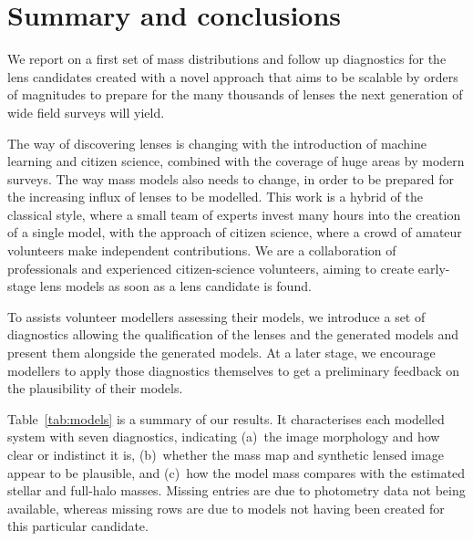 \section{Summary and conclusions}\label{sec:summary}


We report on a first set of mass distributions and follow up diagnostics for 
the {\SW} lens candidates created with a novel approach that aims to be scalable 
by orders of magnitudes to prepare for the many thousands of lenses the next 
generation of wide field surveys will yield.

The way of discovering lenses is changing with the introduction of
machine learning and citizen science, combined with the coverage of
huge areas by modern surveys.  The way mass models also needs to
change, in order to be prepared for the increasing influx of lenses to
be modelled.  This work is a hybrid of the classical style, where a
small team of experts invest many hours into the creation of a single
model, with the approach of citizen science, where a crowd of amateur
volunteers make independent contributions.  We are a collaboration of
professionals and experienced citizen-science volunteers, aiming to
create early-stage lens models as soon as a lens candidate is found.

To assists volunteer modellers assessing their models, we introduce a
set of diagnostics allowing the qualification of the lenses and the
generated models and present them alongside the generated models. At a
later stage, we encourage modellers to apply those diagnostics
themselves to get a preliminary feedback on the plausibility of their
models.

Table~\ref{tab:models} is a summary of our results.  It characterises
each modelled system with seven diagnostics, indicating (a)~the image
morphology and how clear or indistinct it is, (b)~whether the mass map
and synthetic lensed image appear to be plausible, and (c)~how the
model mass compares with the estimated stellar and full-halo masses.
Missing entries are due to photometry data not being available, whereas
missing rows are due to models not having been created for this particular
candidate.

